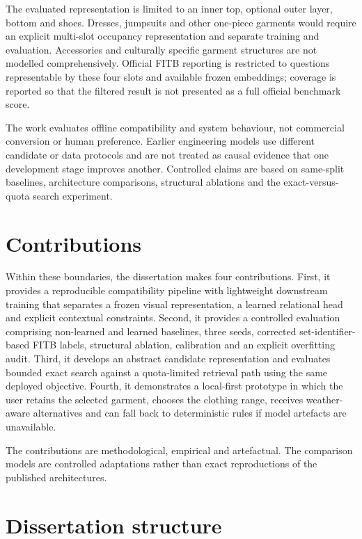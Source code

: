 The evaluated representation is limited to an inner top, optional outer layer,
bottom and shoes. Dresses, jumpsuits and other one-piece garments would require
an explicit multi-slot occupancy representation and separate training and
evaluation. Accessories and culturally specific garment structures are not
modelled comprehensively. Official FITB reporting is restricted to questions
representable by these four slots and available frozen embeddings; coverage is
reported so that the filtered result is not presented as a full official
benchmark score.

The work evaluates offline compatibility and system behaviour, not commercial
conversion or human preference. Earlier engineering models use different
candidate or data protocols and are not treated as causal evidence that one
development stage improves another. Controlled claims are based on
same-split baselines, architecture comparisons, structural ablations and the
exact-versus-quota search experiment.

\section{Contributions}

Within these boundaries, the dissertation makes four contributions. First, it
provides a reproducible compatibility pipeline with lightweight downstream
training that separates a
frozen visual representation, a learned relational head and explicit
contextual constraints. Second, it provides a controlled evaluation comprising
non-learned and learned baselines, three seeds, corrected set-identifier-based
FITB labels, structural ablation, calibration and an explicit overfitting
audit. Third, it develops an abstract candidate representation and evaluates
bounded exact search against a quota-limited retrieval path using the same
deployed objective. Fourth, it demonstrates a local-first prototype in which
the user retains the selected garment, chooses the clothing range, receives
weather-aware alternatives and can fall back to deterministic rules if model
artefacts are unavailable.

The contributions are methodological, empirical and artefactual. The comparison
models are controlled adaptations rather than exact reproductions of the
published architectures.

\section{Dissertation structure}

